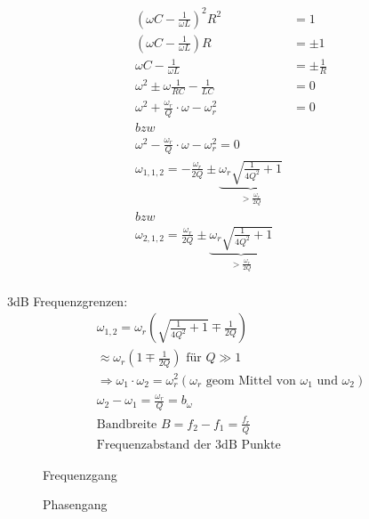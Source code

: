 \begin{align}
	(\omega C-\frac{1}{\omega L})^2R^2 &= 1\nonumber\\
	(\omega C - \frac{1}{\omega L})R &= \pm 1\nonumber\\
	\omega C - \frac{1}{\omega L} &= \pm \frac{1}{R}\nonumber\\
	\omega^2 \pm \omega \frac{1}{RC}-\frac{1}{LC} &= 0\nonumber\\
	\omega^2 + \frac{\omega_r}{Q}\cdot \omega - \omega_r^2&=0 \\ bzw\\ \omega^2 -
	\frac{\omega_r}{Q}\cdot \omega - \omega_r^2=0\nonumber\\
	\omega_{1,1,2} = -\frac{\omega_r}{2Q} \pm 
	\underbrace{\omega_r\sqrt{\frac{1}{4Q^2}+1}}_{>\frac{\omega_r}{2Q}}
	\\	bzw \\
	\omega_{2,1,2}=\frac{\omega_r}{2Q} \pm
	\underbrace{\omega_r\sqrt{\frac{1}{4Q^2}+1}}_{>\frac{\omega_r}{2Q}} \nonumber\\
\end{align}


3dB Frequenzgrenzen:\\
\begin{align}
	\boxed{\omega_{1,2}=\omega_r\left(\sqrt{\frac{1}{4Q^2}+1}\mp\frac{1}{2Q}\right)}\\
	\approx \omega_r\left(1\mp\frac{1}{2Q}\right) \text{ für } Q \gg 1\nonumber\\
	\Rightarrow \omega_1\cdot\omega_2=\omega_r^2 (\omega_r \text{ geom Mittel von
		} \omega_1 \text{ und } \omega_2)\nonumber\\
	\omega_2 - \omega_1 = \frac{\omega_r}{Q} = b_{\omega}\nonumber\\
	\boxed{\text{Bandbreite } B = f_2 - f_1 = \frac{f_r}{Q}}\\
	\text{Frequenzabstand der 3dB Punkte}\nonumber
\end{align}

\begin{figure}[!h]
	\centering
	
	\caption{Frequenzgang}
	\label{fig:ParallelImpedanzBetrag}
\end{figure}
\begin{figure}[!h]
	\centering
	
	\caption{Phasengang}
	\label{fig:ParallelImpedanzPhase}
\end{figure}

